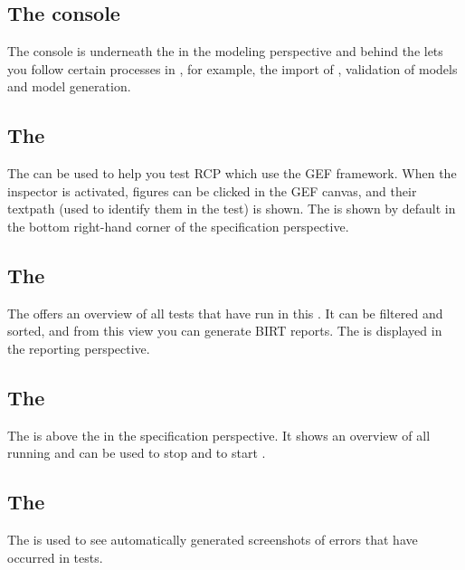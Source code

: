 \subsection{The console}
The console is underneath the \gdmodeleditor{} in the modeling perspective and behind the \gdcompnamesview{} lets you follow certain processes in \gd{}, for example, the import of \gdprojects{}, validation of models and model generation. 

\subsection{The \gdinspector{}}
The \gdinspector{} can be used to help you test RCP \gdauts{} which use the GEF framework. When the inspector is activated, figures can be clicked in the GEF canvas, and their textpath (used to identify them in the test) is shown. The \gdinspector{} is shown by default in the bottom right-hand corner of the specification perspective. 

\subsection{The \gdtestsummaryview{}}
The \gdtestsummaryview{} offers an overview of all tests that have run in this \gddb{}. It can be filtered and sorted, and from this view you can generate \gd{} BIRT reports. The \gdtestsummaryview{} is displayed in the \gd{} reporting perspective. 

\subsection{The \gdrunautview{}}
The \gdrunautview{} is above the \gdtestsuitebrowser{} in the specification perspective. It shows an overview of all running \gdauts{} and can be used to stop \gdauts{} and to start \gdsuites{}.  

\subsection{The \gdimgview{}}
The \gdimgview{} is used to see automatically generated screenshots of errors that have occurred in tests.
